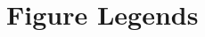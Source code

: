 \documentclass[onecolumn, compsoc,11pt]{IEEEtran}
\begin{document}

























































































































\clearpage
\section*{Figure Legends}
\end{document}
